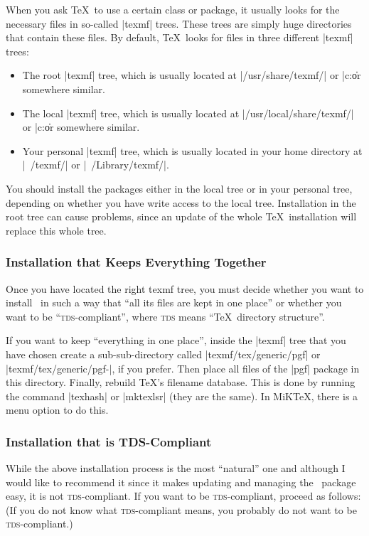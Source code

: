 When you ask \TeX\ to use a certain class or package, it usually looks for the
necessary files in so-called |texmf| trees. These trees are simply huge
directories that contain these files. By default, \TeX\ looks for files in
three different |texmf| trees:
%
\begin{itemize}
    \item The root |texmf| tree, which is usually located at
        |/usr/share/texmf/| or |c:\texmf\| or somewhere similar.
    \item The local  |texmf| tree, which is usually located at
        |/usr/local/share/texmf/| or |c:\localtexmf\| or somewhere similar.
    \item Your personal  |texmf| tree, which is usually located in your home
        directory at |~/texmf/| or |~/Library/texmf/|.
\end{itemize}

You should install the packages either in the local tree or in your personal
tree, depending on whether you have write access to the local tree.
Installation in the root tree can cause problems, since an update of the whole
\TeX\ installation will replace this whole tree.


\subsubsection{Installation that Keeps Everything Together}

Once you have located the right texmf tree, you must decide whether you want to
install \pgfname\ in such a way that ``all its files are kept in one place'' or
whether you want to be ``\textsc{tds}-compliant'', where \textsc{tds} means
``\TeX\ directory structure''.

If you want to keep ``everything in one place'', inside the |texmf| tree that
you have chosen create a sub-sub-directory called |texmf/tex/generic/pgf| or
|texmf/tex/generic/pgf-|\texttt{\pgfversion}, if you prefer. Then place all
files of the |pgf| package in this directory. Finally, rebuild \TeX's filename
database. This is done by running the command |texhash| or |mktexlsr| (they are
the same). In MiK\TeX, there is a menu option to do this.


\subsubsection{Installation that is TDS-Compliant}

While the above installation process is the most ``natural'' one and although I
would like to recommend it since it makes updating and managing the \pgfname\
package easy, it is not \textsc{tds}-compliant. If you want to be
\textsc{tds}-compliant, proceed as follows: (If you do not know what
\textsc{tds}-compliant means, you probably do not want to be
\textsc{tds}-compliant.)

